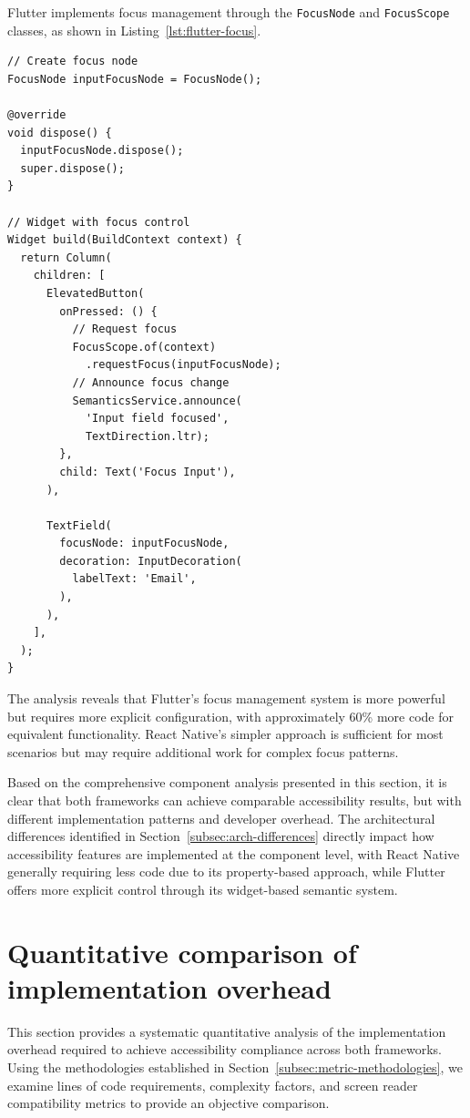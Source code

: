 Flutter implements focus management through the \texttt{FocusNode} and \texttt{FocusScope} classes, as shown in Listing~\ref{lst:flutter-focus}.

\begin{lstlisting}[style=DartStyle, caption=Focus management in Flutter, label=lst:flutter-focus]
// Create focus node
FocusNode inputFocusNode = FocusNode();

@override
void dispose() {
  inputFocusNode.dispose();
  super.dispose();
}

// Widget with focus control
Widget build(BuildContext context) {
  return Column(
    children: [
      ElevatedButton(
        onPressed: () {
          // Request focus
          FocusScope.of(context)
            .requestFocus(inputFocusNode);
          // Announce focus change
          SemanticsService.announce(
            'Input field focused',
            TextDirection.ltr);
        },
        child: Text('Focus Input'),
      ),
      
      TextField(
        focusNode: inputFocusNode,
        decoration: InputDecoration(
          labelText: 'Email',
        ),
      ),
    ],
  );
}
\end{lstlisting}

\pagebreak

The analysis reveals that Flutter's focus management system is more powerful but requires more explicit configuration, with approximately 60\% more code for equivalent functionality. React Native's simpler approach is sufficient for most scenarios but may require additional work for complex focus patterns.

Based on the comprehensive component analysis presented in this section, it is clear that both frameworks can achieve comparable accessibility results, but with different implementation patterns and developer overhead. The architectural differences identified in Section~\ref{subsec:arch-differences} directly impact how accessibility features are implemented at the component level, with React Native generally requiring less code due to its property-based approach, while Flutter offers more explicit control through its widget-based semantic system.

\section{Quantitative comparison of implementation overhead}
\label{sec:quantitative-comparison}

This section provides a systematic quantitative analysis of the implementation overhead required to achieve accessibility compliance across both frameworks. Using the methodologies established in Section~\ref{subsec:metric-methodologies}, we examine lines of code requirements, complexity factors, and screen reader compatibility metrics to provide an objective comparison.

